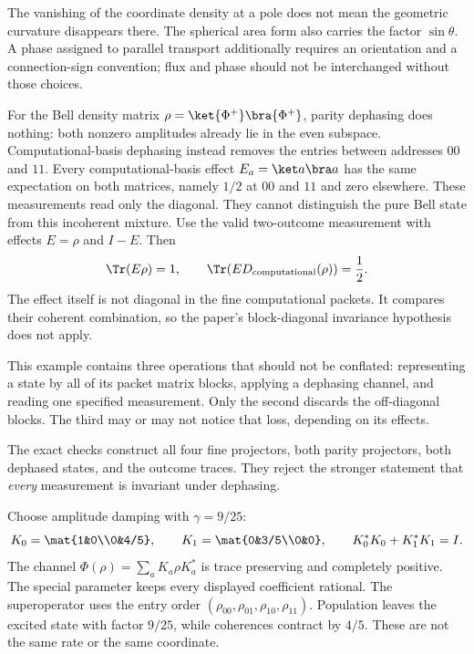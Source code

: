 The vanishing of the coordinate density at a pole does not mean the geometric curvature disappears there. The spherical area form also carries the factor $\sin\theta$. A phase assigned to parallel transport additionally requires an orientation and a connection-sign convention; flux and phase should not be interchanged without those choices.

For the Bell density matrix $\rho=\ket{\Phi^+}\bra{\Phi^+}$, parity dephasing does nothing: both nonzero amplitudes already lie in the even subspace. Computational-basis dephasing instead removes the entries between addresses $00$ and $11$.
Every computational-basis effect $E_a=\ket a\bra a$ has the same expectation on both matrices, namely $1/2$ at $00$ and $11$ and zero elsewhere. These measurements read only the diagonal. They cannot distinguish the pure Bell state from this incoherent mixture.
Use the valid two-outcome measurement with effects $E=\rho$ and $I-E$. Then
\[
\Tr(E\rho)=1,\qquad
\Tr\!\left(E D_{\rm computational}(\rho)\right)=\frac12.
\]
The effect itself is not diagonal in the fine computational packets. It compares their coherent combination, so the paper's block-diagonal invariance hypothesis does not apply.

This example contains three operations that should not be conflated: representing a state by all of its packet matrix blocks, applying a dephasing channel, and reading one specified measurement. Only the second discards the off-diagonal blocks. The third may or may not notice that loss, depending on its effects.

The exact checks construct all four fine projectors, both parity projectors, both dephased states, and the outcome traces. They reject the stronger statement that \emph{every} measurement is invariant under dephasing.

Choose amplitude damping with $\gamma=9/25$:
\[
K_0=\mat{1&0\\0&4/5},\qquad
K_1=\mat{0&3/5\\0&0},\qquad K_0^*K_0+K_1^*K_1=I.
\]
The channel $\Phi(\rho)=\sum_aK_a\rho K_a^*$ is trace preserving and completely positive. The special parameter keeps every displayed coefficient rational.
The superoperator uses the entry order $(\rho_{00},\rho_{01},\rho_{10},\rho_{11})$. Population leaves the excited state with factor $9/25$, while coherences contract by $4/5$. These are not the same rate or the same coordinate.

